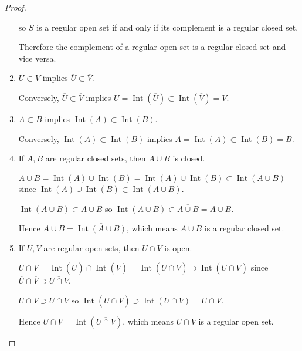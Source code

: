 \begin{proof}
\begin{enumerate}[leftmargin=*,label={(\alph*)},itemsep=0pt]
              so \( S \) is a regular open set if and only if its complement is a regular closed set.

              Therefore the complement of a regular open set is a regular closed set and vice versa.
        \item \( U \subset V \) implies \( \overline{U} \subset \overline{V} \).

              Conversely, \( \overline{U} \subset \overline{V} \) implies \( U = \operatorname{Int}(\overline{U}) \subset \operatorname{Int}(\overline{V}) = V \).

        \item \( A \subset B \) implies \( \operatorname{Int}(A) \subset \operatorname{Int}(B) \).

              Conversely, \( \operatorname{Int}(A) \subset \operatorname{Int}(B) \) implies \( A = \overline{\operatorname{Int}(A)} \subset \overline{\operatorname{Int}(B)} = B \).
        \item If \( A, B \) are regular closed sets, then \( A \cup B \) is closed.

              \( A \cup B = \overline{\operatorname{Int}(A)} \cup \overline{\operatorname{Int}(B)} = \overline{\operatorname{Int}(A) \cup \operatorname{Int}(B)} \subset \overline{\operatorname{Int}(A \cup B)} \) since \( \operatorname{Int}(A) \cup \operatorname{Int}(B) \subset \operatorname{Int}(A \cup B) \).

              \( \operatorname{Int}(A \cup B) \subset A \cup B \) so \( \overline{\operatorname{Int}(A \cup B)} \subset \overline{A \cup B} = A \cup B \).

              Hence \( A \cup B = \overline{\operatorname{Int}(A \cup B)} \), which means \( A \cup B \) is a regular closed set.
        \item If \( U, V \) are regular open sets, then \( U \cap V \) is open.

              \( U \cap V = \operatorname{Int}(\overline{U}) \cap \operatorname{Int}(\overline{V}) = \operatorname{Int}(\overline{U} \cap \overline{V}) \supset \operatorname{Int}(\overline{U \cap V}) \) since \( \overline{U} \cap \overline{V} \supset \overline{U \cap V} \).

              \( \overline{U \cap V} \supset U \cap V \) so \( \operatorname{Int}(\overline{U \cap V}) \supset \operatorname{Int}(U \cap V) = U \cap V \).

              Hence \( U \cap V = \operatorname{Int}(\overline{U \cap V}) \), which means \( U \cap V \) is a regular open set.
    \end{enumerate}
\end{proof}

